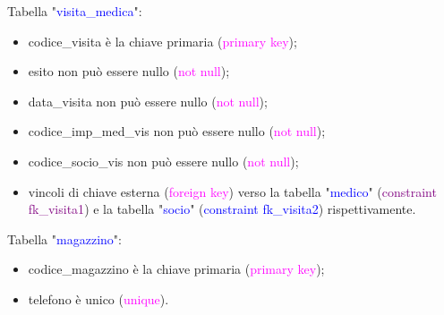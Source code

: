 \documentclass{article}
\begin{document}
    \begin{flushleft}
        Tabella "\textcolor{blue}{visita\_medica}": \\
        \begin{itemize}
            \item codice\_visita è la chiave primaria (\textcolor{magenta}{primary key}); \\
            \item esito non può essere nullo (\textcolor{magenta}{not null}); \\
            \item data\_visita non può essere nullo (\textcolor{magenta}{not null}); \\
            \item codice\_imp\_med\_vis non può essere nullo (\textcolor{magenta}{not null}); \\
            \item codice\_socio\_vis non può essere nullo (\textcolor{magenta}{not null}); \\ 
            \item vincoli di chiave esterna (\textcolor{magenta}{foreign key}) verso la tabella "\textcolor{blue}{medico}" (\textcolor{purple}{constraint fk\_visita1}) e la tabella "\textcolor{blue}{socio}" (\textcolor{blue}{constraint fk\_visita2}) rispettivamente. \\
        \end{itemize}        
    \end{flushleft}

    \begin{flushleft}
        Tabella "\textcolor{blue}{magazzino}": \\
        \begin{itemize}
            \item codice\_magazzino è la chiave primaria (\textcolor{magenta}{primary key}); \\
            \item telefono è unico (\textcolor{magenta}{unique}). \\
        \end{itemize}        
    \end{flushleft}
\end{document}
